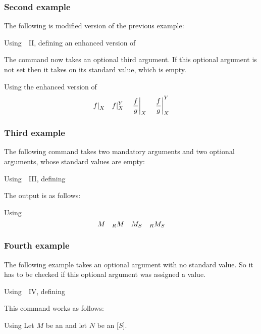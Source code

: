 \subsubsection{Second example}

The following is modified version of the previous example:
\begin{showcode}{Using~~II, defining an enhanced version of~}
\end{showcode}
The command now takes an optional third argument.
If this optional argument is not set then it takes on its standard value, which is empty.
\begin{showlatex}{Using the enhanced version of }
\[
  \restrict{f}{X}
  \quad
  \restrict{f}{X}[Y]
  \quad
  \restrict*{\frac{f}{g}}{X}
  \quad
  \restrict*{\frac{f}{g}}{X}[Y]
\]
\end{showlatex}

\subsubsection{Third example}

The following command takes two mandatory arguments and two optional arguments, whose standard values are empty:
\begin{showcode}{Using~~III, defining~}
\end{showcode}
The output is as follows:
\begin{showlatex}{Using }
\[
  \moduleindex{M}
  \quad
  \moduleindex[R]{M}
  \quad
  \moduleindex{M}[S]
  \quad
  \moduleindex[R]{M}[S]
\]
\end{showlatex}

\subsubsection{Fourth example}

The following example takes an optional argument with no standard value.
So it has to be checked if this optional argument was assigned a value.
\begin{showcode}{Using~~IV, defining~}
\end{showcode}
This command works as follows:
\begin{showlatex}{Using}
Let $M$ be an  and let $N$ be an [$S$].
\end{showlatex}





